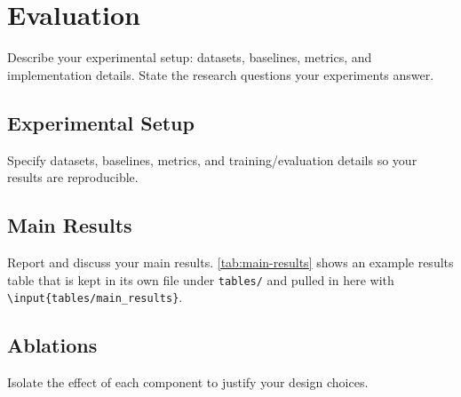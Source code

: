 \section{Evaluation}
\label{sec:evaluation}

Describe your experimental setup: datasets, baselines, metrics, and
implementation details. State the research questions your experiments answer.

\subsection{Experimental Setup}
\label{subsec:setup}
Specify datasets, baselines, metrics, and training/evaluation details so your
results are reproducible.

\subsection{Main Results}
\label{subsec:results}
Report and discuss your main results. \cref{tab:main-results} shows an example
results table that is kept in its own file under \texttt{tables/} and pulled in
here with \texttt{\textbackslash input\{tables/main\_results\}}.



\subsection{Ablations}
\label{subsec:ablations}
Isolate the effect of each component to justify your design choices.

